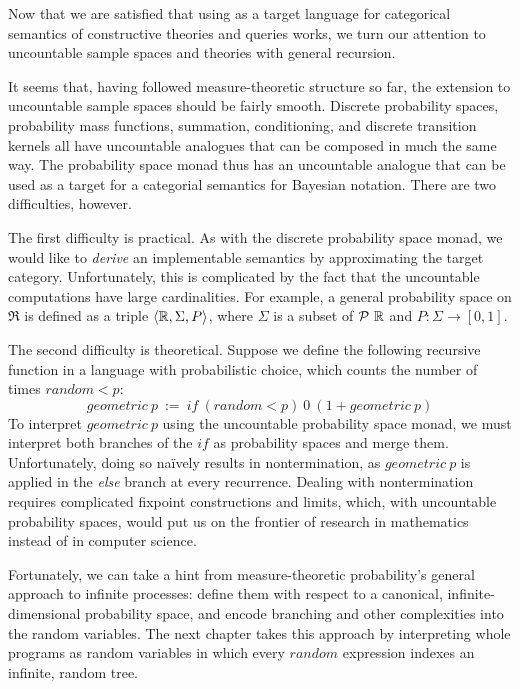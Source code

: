 Now that we are satisfied that using \lzfclang as a target language for categorical semantics of constructive theories and queries works, we turn our attention to uncountable sample spaces and theories with general recursion.

It seems that, having followed measure-theoretic structure so far, the extension to uncountable sample spaces should be fairly smooth.
Discrete probability spaces, probability mass functions, summation, conditioning, and discrete transition kernels all have uncountable analogues that can be composed in much the same way.
The probability space monad thus has an uncountable analogue that can be used as a target for a categorial semantics for Bayesian notation.
There are two difficulties, however.

The first difficulty is practical.
As with the discrete probability space monad, we would like to \emph{derive} an implementable semantics by approximating the target category.
Unfortunately, this is complicated by the fact that the uncountable computations have large cardinalities.
For example, a general probability space on $\Re$ is defined as a triple $\langle{\mathbb{R},\Sigma,P}\rangle$, where $\Sigma$ is a subset of $\mathcal{P}~\mathbb{R}$ and $P : \Sigma \to [0,1]$.

The second difficulty is theoretical.
Suppose we define the following recursive function in a language with probabilistic choice, which counts the number of times $random < p$:
\begin{equation}
	geometric~p \ := \ if~(random < p)~0~(1 + geometric~p)
\end{equation}
To interpret $geometric~p$ using the uncountable probability space monad, we must interpret both branches of the $if$ as probability spaces and merge them.
Unfortunately, doing so na\"ively results in nontermination, as $geometric~p$ is applied in the \emph{else} branch at every recurrence.
Dealing with nontermination requires complicated fixpoint constructions and limits, which, with uncountable probability spaces, would put us on the frontier of research in mathematics instead of in computer science.

Fortunately, we can take a hint from measure-theoretic probability's general approach to infinite processes: define them with respect to a canonical, infinite-dimensional probability space, and encode branching and other complexities into the random variables.
The next chapter takes this approach by interpreting whole programs as random variables in which every $random$ expression indexes an infinite, random tree.
